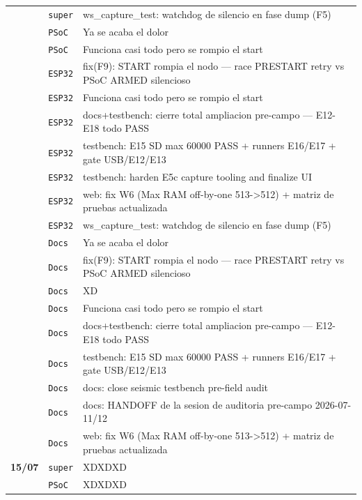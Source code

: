 \begin{longtable}{@{}p{1.7cm} p{1.5cm} p{12.2cm}@{}}
 & \texttt{\scriptsize super} & ws\_capture\_test: watchdog de silencio en fase dump (F5) \\
 & \texttt{\scriptsize PSoC} & Ya se acaba el dolor \\
 & \texttt{\scriptsize PSoC} & Funciona casi todo pero se rompio el start \\
 & \texttt{\scriptsize ESP32} & fix(F9): START rompia el nodo --- race PRESTART retry vs PSoC ARMED silencioso \\
 & \texttt{\scriptsize ESP32} & Funciona casi todo pero se rompio el start \\
 & \texttt{\scriptsize ESP32} & docs+testbench: cierre total ampliacion pre-campo --- E12-E18 todo PASS \\
 & \texttt{\scriptsize ESP32} & testbench: E15 SD max 60000 PASS + runners E16/E17 + gate USB/E12/E13 \\
 & \texttt{\scriptsize ESP32} & testbench: harden E5c capture tooling and finalize UI \\
 & \texttt{\scriptsize ESP32} & web: fix W6 (Max RAM off-by-one 513->512) + matriz de pruebas actualizada \\
 & \texttt{\scriptsize ESP32} & ws\_capture\_test: watchdog de silencio en fase dump (F5) \\
 & \texttt{\scriptsize Docs} & Ya se acaba el dolor \\
 & \texttt{\scriptsize Docs} & fix(F9): START rompia el nodo --- race PRESTART retry vs PSoC ARMED silencioso \\
 & \texttt{\scriptsize Docs} & XD \\
 & \texttt{\scriptsize Docs} & Funciona casi todo pero se rompio el start \\
 & \texttt{\scriptsize Docs} & docs+testbench: cierre total ampliacion pre-campo --- E12-E18 todo PASS \\
 & \texttt{\scriptsize Docs} & testbench: E15 SD max 60000 PASS + runners E16/E17 + gate USB/E12/E13 \\
 & \texttt{\scriptsize Docs} & docs: close seismic testbench pre-field audit \\
 & \texttt{\scriptsize Docs} & docs: HANDOFF de la sesion de auditoria pre-campo 2026-07-11/12 \\
 & \texttt{\scriptsize Docs} & web: fix W6 (Max RAM off-by-one 513->512) + matriz de pruebas actualizada \\
\textbf{15/07} & \texttt{\scriptsize super} & XDXDXD \\
 & \texttt{\scriptsize PSoC} & XDXDXD \\

\end{longtable}
